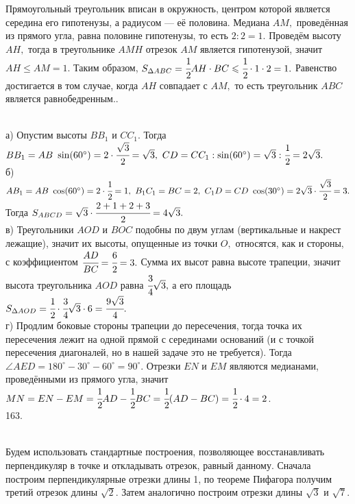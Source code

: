 Прямоугольный треугольник вписан в окружность, центром которой является середина его гипотенузы, а радиусом --- её половина. Медиана $AM,$ проведённая из прямого угла, равна половине гипотенузы, то есть $2:2=1.$ Проведём высоту $AH,$ тогда в треугольнике $AMH$ отрезок $AM$ является гипотенузой, значит $AH\leqslant AM=1.$ Таким образом, $S_{\Delta ABC}=\cfrac{1}{2}AH\cdot BC \leqslant \cfrac{1}{2}\cdot 1 \cdot 2=1.$ Равенство достигается в том случае, когда $AH$ совпадает с $AM,$ то есть треугольник $ABC$ является равнобедренным.\newpage{}. \begin{figure}[ht!]
\end{figure}\\
а) Опустим высоты $BB_1$ и $CC_1.$ Тогда $BB_1=AB\ \sin(60^\circ)=2\cdot \cfrac{\sqrt{3}}{2}=\sqrt{3},\ CD=CC_1:\sin(60^\circ)=\sqrt{3}:\cfrac{1}{2}=2\sqrt{3}.$\\
б) $AB_1=AB\ \cos(60^\circ)=2 \cdot \cfrac{1}{2}=1,\ B_1C_1=BC=2,\ C_1D=CD\ \cos(30^\circ)=2\sqrt{3}\cdot \cfrac{\sqrt{3}}{2}=3.$ Тогда $S_{ABCD}=\sqrt{3}\cdot\cfrac{2+1+2+3}{2}=4\sqrt{3}.$\\
в) Треугольники $AOD$ и $BOC$ подобны по двум углам (вертикальные и накрест лежащие), значит их высоты, опущенные из точки $O,$ относятся, как и стороны, с коэффициентом $\cfrac{AD}{BC}=\cfrac{6}{2}=3.$ Сумма их высот равна высоте трапеции, значит высота треугольника $AOD$ равна $\cfrac{3}{4}\sqrt{3},$ а его площадь $S_{\Delta AOD}=\cfrac{1}{2}\cdot\cfrac{3}{4}\sqrt{3}\cdot6=\cfrac{9\sqrt{3}}{4}.$\\
г) Продлим боковые стороны трапеции до пересечения, тогда точка их пересечения лежит на одной прямой с серединами оснований (и с точкой пересечения диагоналей, но в нашей задаче это не требуется). Тогда $\angle AED=180^\circ-30^\circ-60^\circ=90^\circ.$ Отрезки $EN$ и $EM$ являются медианами, проведёнными из прямого угла, значит $MN=EN-EM=\cfrac{1}{2}AD-\cfrac{1}{2}BC=\cfrac{1}{2}(AD-BC)=\cfrac{1}{2}\cdot4=2$.\\
163. \begin{figure}[ht!]
\end{figure}\\
Будем использовать стандартные построения, позволяющее восстанавливать перпендикуляр в точке и откладывать отрезок, равный данному. Сначала построим перпендикулярные отрезки длины 1, по теореме Пифагора получим третий отрезок длины $\sqrt{2}.$ Затем аналогично построим отрезки длины $\sqrt{3}$ и $\sqrt{7}.$\newpage\noindent
